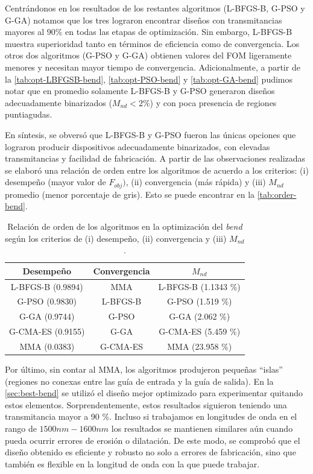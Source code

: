 Centrándonos en los resultados de los restantes algoritmos (L-BFGS-B, G-PSO y G-GA)
notamos que los tres lograron encontrar diseños con transmitancias mayores al $90 \%$
en todas las etapas de optimización. Sin embargo, L-BFGS-B muestra superioridad 
tanto en términos de eficiencia como de convergencia. Los otros dos algoritmos (G-PSO y G-GA)
obtienen valores del FOM ligeramente menores y necesitan mayor tiempo de convergencia.
Adicionalmente, a partir de la \autoref{tab:opt-LBFGSB-bend}, \autoref{tab:opt-PSO-bend} y
\autoref{tab:opt-GA-bend} pudimos notar que en promedio solamente L-BFGS-B y G-PSO
generaron diseños adecuadamente binarizados ($M_{nd} < 2 \%$) y con poca presencia de regiones
puntiagudas.

En síntesis, se obversó que L-BFGS-B y G-PSO fueron las únicas opciones que lograron
producir dispositivos adecuadamente binarizados, con elevadas transmitancias y 
facilidad de fabricación.
A partir de las observaciones realizadas se elaboró una relación de orden entre los 
algoritmos de acuerdo a los criterios: 
(i) desempeño (mayor valor de $F_{obj})$, 
(ii) convergencia (más rápida) y 
(iii) $M_{nd}$ promedio (menor porcentaje de gris).
Esto se puede encontrar en la \autoref{tab:order-bend}.

\begin{table}[ht]
    \centering
    \begin{tabular}{|c|c|c|}
    \hline 
    Desempeño &  Convergencia & $M_{nd} $\\
    \hline 
    L-BFGS-B (0.9894) & MMA      &  L-BFGS-B (1.1343 \%) \\
    G-PSO (0.9830)    & L-BFGS-B & G-PSO (1.519 \%) \\
    G-GA (0.9744)     & G-PSO    & G-GA (2.062 \%) \\
    G-CMA-ES (0.9155) & G-GA     & G-CMA-ES (5.459 \%) \\
    MMA (0.0383)      & G-CMA-ES & MMA (23.958 \%) \\
    \hline 
    \end{tabular}
    \caption{Relación de orden de los algoritmos en la optimización del \emph{bend} según
             los criterios de (i) desempeño, (ii) convergencia y (iii) $M_{nd}$.}
    \label{tab:order-bend}
\end{table}


Por último, sin contar al MMA, los algoritmos produjeron pequeñas ``islas''
(regiones no conexas entre las guía de entrada y la guía de salida).
En la \autoref{sec:best-bend} se utilizó el diseño mejor optimizado para experimentar
quitando estos elementos. 
Sorprendentemente, estos resultados siguieron teniendo una transmitancia
mayor a 90 \%.
Incluso si trabajamos en longitudes de onda en el rango de $1500nm-1600nm$
los resultados se mantienen similares aún cuando pueda ocurrir errores de erosión o dilatación.
De este modo, se comprobó que el diseño obtenido es eficiente y robusto no solo a errores
de fabricación, sino que también es flexible en la longitud de onda con la que puede trabajar.


